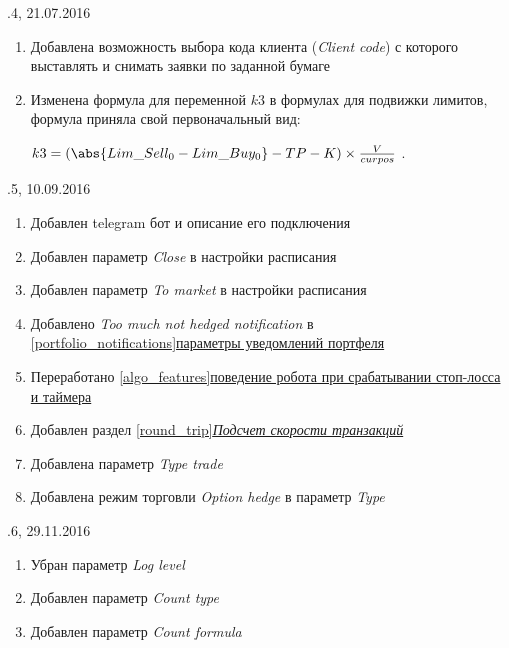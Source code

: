 \vspace{5mm}

.4, 21.07.2016
\begin{enumerate}
	\item Добавлена возможность выбора кода клиента (\textit{Client code}) с которого выставлять и снимать заявки по заданной бумаге
	\item Изменена формула для переменной $k3$ в формулах для подвижки лимитов, формула приняла свой первоначальный вид:
		
		$k3 = \left(\abs{Lim\_Sell_0 - Lim\_Buy_0} - TP - K \right) \times \frac{V}{curpos}$ .
\end{enumerate}

\vspace{5mm}

.5, 10.09.2016
\begin{enumerate}
	\item Добавлен telegram бот и описание его подключения
	\item Добавлен параметр \textit{Close} в настройки расписания
	\item Добавлен параметр \textit{To market} в настройки расписания
	\item Добавлено \textit{Too much not hedged notification} в \hyperref[portfolio_notifications]{\ref{portfolio_notifications}параметры уведомлений портфеля}
	\item Переработано \hyperref[algo_features]{\ref{algo_features}поведение робота при срабатывании стоп-лосса и таймера}
	\item Добавлен раздел \hyperref[round_trip]{\ref{round_trip}\textit{Подсчет скорости транзакций}}
	\item Добавлена параметр \textit{Type trade}
	\item Добавлена режим торговли \textit{Option hedge} в параметр \textit{Type}
\end{enumerate}

\vspace{5mm}

.6, 29.11.2016
\begin{enumerate}
	\item Убран параметр \textit{Log level}
    \item Добавлен параметр \textit{Count type}
    \item Добавлен параметр \textit{Count formula}
\end{enumerate}

